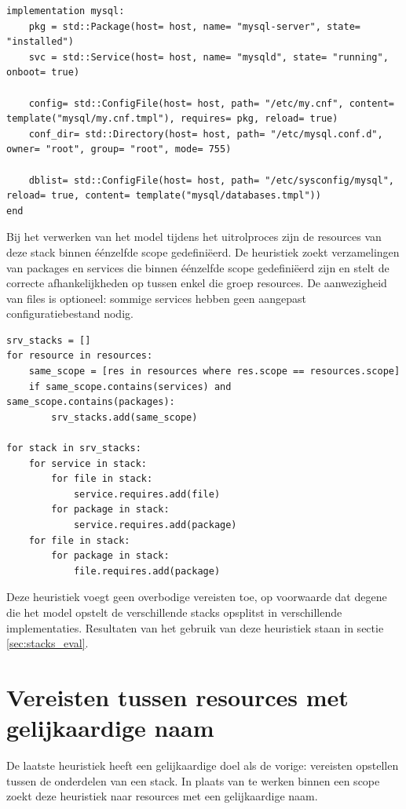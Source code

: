 \begin{minipage}{\textwidth}
\begin{lstlisting}
implementation mysql:
    pkg = std::Package(host= host, name= "mysql-server", state= "installed")
    svc = std::Service(host= host, name= "mysqld", state= "running", onboot= true)

    config= std::ConfigFile(host= host, path= "/etc/my.cnf", content= template("mysql/my.cnf.tmpl"), requires= pkg, reload= true)
    conf_dir= std::Directory(host= host, path= "/etc/mysql.conf.d", owner= "root", group= "root", mode= 755)

    dblist= std::ConfigFile(host= host, path= "/etc/sysconfig/mysql", reload= true, content= template("mysql/databases.tmpl"))
end
\end{lstlisting}
\end{minipage}

Bij het verwerken van het model tijdens het uitrolproces zijn de resources van deze stack binnen \'e\'enzelfde scope gedefini\"eerd.
De heuristiek zoekt verzamelingen van packages en services die binnen \'e\'enzelfde scope gedefini\"eerd zijn en stelt de correcte afhankelijkheden op tussen enkel die groep resources.
De aanwezigheid van files is optioneel: sommige services hebben geen aangepast configuratiebestand nodig.

\begin{minipage}{\textwidth}
\begin{lstlisting}
srv_stacks = []
for resource in resources:
    same_scope = [res in resources where res.scope == resources.scope]
    if same_scope.contains(services) and same_scope.contains(packages):
        srv_stacks.add(same_scope)

for stack in srv_stacks:
    for service in stack:
        for file in stack:
            service.requires.add(file)
        for package in stack:
            service.requires.add(package)
    for file in stack:
        for package in stack:
            file.requires.add(package)
\end{lstlisting}
\end{minipage}

Deze heuristiek voegt geen overbodige vereisten toe, op voorwaarde dat degene die het model opstelt de verschillende stacks opsplitst in verschillende implementaties.
Resultaten van het gebruik van deze heuristiek staan in sectie \ref{sec:stacks_eval}.

\section{Vereisten tussen resources met gelijkaardige naam}
\label{sec:namen}
De laatste heuristiek heeft een gelijkaardige doel als de vorige: vereisten opstellen tussen de onderdelen van een stack.
In plaats van te werken binnen een scope zoekt deze heuristiek naar resources met een gelijkaardige naam.


